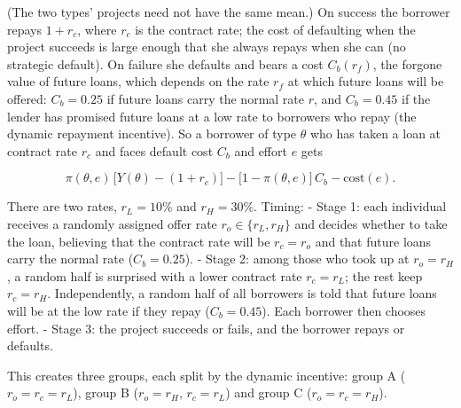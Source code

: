 \documentclass[11pt,a4paper]{article}
\begin{document}
(The two types' projects need not have the same mean.) On success the borrower repays \(1 + r_c\),
where \(r_c\) is the contract rate; the cost of defaulting when the project succeeds is large enough
that she always repays when she can (no strategic default). On failure she defaults and bears a cost
\(C_b(r_f)\), the forgone value of future loans, which depends on the rate \(r_f\) at which future
loans will be offered: \(C_b = 0.25\) if future loans carry the normal rate \(r\), and
\(C_b = 0.45\) if the lender has promised future loans at a low rate to borrowers who repay (the
dynamic repayment incentive). So a borrower of type \(\theta\) who has taken a loan at contract rate
\(r_c\) and faces default cost \(C_b\) and effort \(e\) gets

\[\pi(\theta, e)\,\big[Y(\theta) - (1 + r_c)\big] - \big[1 - \pi(\theta, e)\big]\,C_b - \text{cost}(e).\]

There are two rates, \(r_L = 10\%\) and \(r_H = 30\%\). Timing: - Stage 1: each individual receives
a randomly assigned offer rate \(r_o \in \{r_L, r_H\}\) and decides whether to take the loan,
believing that the contract rate will be \(r_c = r_o\) and that future loans carry the normal rate
(\(C_b = 0.25\)). - Stage 2: among those who took up at \(r_o = r_H\), a random half is surprised
with a lower contract rate \(r_c = r_L\); the rest keep \(r_c = r_H\). Independently, a random half
of all borrowers is told that future loans will be at the low rate if they repay (\(C_b = 0.45\)).
Each borrower then chooses effort. - Stage 3: the project succeeds or fails, and the borrower repays
or defaults.

This creates three groups, each split by the dynamic incentive: group A (\(r_o = r_c = r_L\)), group
B (\(r_o = r_H\), \(r_c = r_L\)) and group C (\(r_o = r_c = r_H\)).
\end{document}
